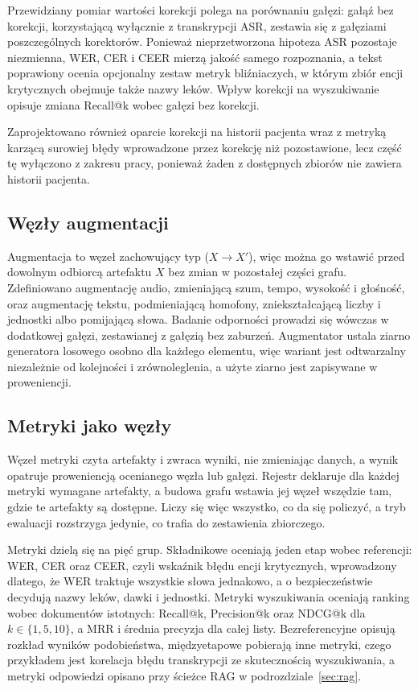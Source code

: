 Przewidziany pomiar wartości korekcji polega na porównaniu gałęzi: gałąź bez korekcji, korzystającą
wyłącznie z transkrypcji ASR, zestawia się z gałęziami poszczególnych korektorów. Ponieważ nieprzetworzona
hipoteza ASR pozostaje niezmienna, WER, CER i CEER mierzą jakość samego rozpoznania, a tekst
poprawiony ocenia opcjonalny zestaw metryk bliźniaczych, w którym zbiór encji krytycznych obejmuje
także nazwy leków. Wpływ korekcji na wyszukiwanie opisuje zmiana Recall@k wobec gałęzi bez
korekcji.

Zaprojektowano również oparcie korekcji na historii pacjenta wraz z metryką karzącą surowiej błędy
wprowadzone przez korekcję niż pozostawione, lecz część tę wyłączono z zakresu pracy, ponieważ
żaden z dostępnych zbiorów nie zawiera historii pacjenta.

\subsection{Węzły augmentacji}
Augmentacja to węzeł zachowujący typ ($X \rightarrow X'$), więc można go wstawić przed dowolnym
odbiorcą artefaktu $X$ bez zmian w pozostałej części grafu. Zdefiniowano augmentację audio,
zmieniającą szum, tempo, wysokość i głośność, oraz augmentację tekstu, podmieniającą homofony,
zniekształcającą liczby i jednostki albo pomijającą słowa. Badanie odporności prowadzi się wówczas
w dodatkowej gałęzi, zestawianej z gałęzią bez zaburzeń. Augmentator ustala ziarno generatora
losowego osobno dla każdego elementu, więc wariant jest odtwarzalny niezależnie od kolejności i
zrównoleglenia, a użyte ziarno jest zapisywane w proweniencji.

\subsection{Metryki jako węzły}
Węzeł metryki czyta artefakty i zwraca wyniki, nie zmieniając danych, a wynik opatruje
proweniencją ocenianego węzła lub gałęzi. Rejestr deklaruje dla każdej metryki wymagane artefakty, a budowa grafu wstawia jej węzeł wszędzie tam,
gdzie te artefakty są dostępne. Liczy się więc wszystko, co da się policzyć, a tryb ewaluacji
rozstrzyga jedynie, co trafia do zestawienia zbiorczego.

Metryki dzielą się na pięć grup. Składnikowe oceniają jeden etap wobec referencji: WER, CER oraz
CEER, czyli wskaźnik błędu encji krytycznych, wprowadzony dlatego, że WER traktuje wszystkie słowa
jednakowo, a o bezpieczeństwie decydują nazwy leków, dawki i jednostki. Metryki wyszukiwania
\cite{manning2008introduction, salton1983introduction} oceniają ranking wobec dokumentów
istotnych: Recall@k, Precision@k oraz NDCG@k \cite{jarvelin2002cumulated} dla $k \in \{1,5,10\}$,
a MRR i średnia precyzja dla całej listy. Bezreferencyjne opisują rozkład wyników podobieństwa,
międzyetapowe pobierają inne metryki, czego przykładem jest korelacja błędu transkrypcji ze
skutecznością wyszukiwania, a metryki odpowiedzi opisano przy ścieżce RAG w
podrozdziale~\ref{sec:rag}.

